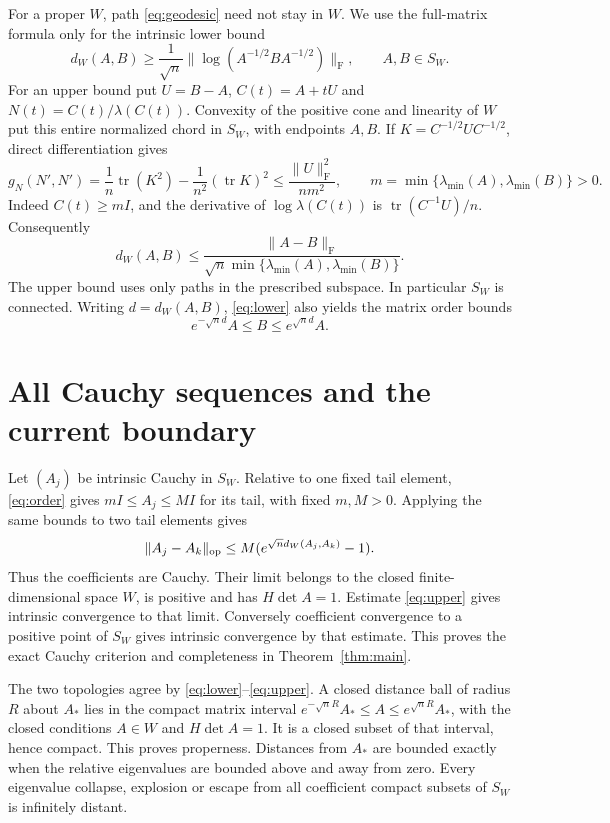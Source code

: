 \documentclass[11pt]{article}
\newcommand{\tr}{\operatorname{tr}}
\newcommand{\Frob}{\mathrm F}
\begin{document}
For a proper $W$, path \eqref{eq:geodesic} need not stay in $W$.
We use the full-matrix formula only for the intrinsic lower bound
\begin{equation}\label{eq:lower}
 d_W(A,B)\geq\frac1{\sqrt n}
                   \|\log(A^{-1/2}BA^{-1/2})\|_\Frob,
 \qquad A,B\in S_W.
\end{equation}
For an upper bound put $U=B-A$, $C(t)=A+tU$ and
$N(t)=C(t)/\lambda(C(t))$.
Convexity of the positive cone and linearity of $W$ put this entire
normalized chord in $S_W$, with endpoints $A,B$.
If $K=C^{-1/2}UC^{-1/2}$, direct differentiation gives
\[
 g_N(N',N')=\frac1n\tr(K^2)-\frac1{n^2}(\tr K)^2
 \leq\frac{\|U\|_\Frob^2}{nm^2},\qquad
 m=\min\{\lambda_{\min}(A),\lambda_{\min}(B)\}>0.
\]
Indeed $C(t)\geq mI$, and the derivative of $\log\lambda(C(t))$
is $\tr(C^{-1}U)/n$. Consequently
\begin{equation}\label{eq:upper}
 d_W(A,B)\leq\frac{\|A-B\|_\Frob}
                  {\sqrt n\min\{\lambda_{\min}(A),\lambda_{\min}(B)\}}.
\end{equation}
The upper bound uses only paths in the prescribed subspace.
In particular $S_W$ is connected.
Writing $d=d_W(A,B)$, \eqref{eq:lower} also yields the matrix order bounds
\begin{equation}\label{eq:order}
 e^{-\sqrt n d}A\leq B\leq e^{\sqrt n d}A.
\end{equation}

\section{All Cauchy sequences and the current boundary}
Let $(A_j)$ be intrinsic Cauchy in $S_W$.
Relative to one fixed tail element, \eqref{eq:order} gives
$mI\leq A_j\leq MI$ for its tail, with fixed $m,M>0$.
Applying the same bounds to two tail elements gives
\[
 \|A_j-A_k\|_{\rm op}\leq M(e^{\sqrt n d_W(A_j,A_k)}-1).
\]
Thus the coefficients are Cauchy. Their limit belongs to the closed
finite-dimensional space $W$, is positive and has $H\det A=1$.
Estimate \eqref{eq:upper} gives intrinsic convergence to that limit.
Conversely coefficient convergence to a positive point of $S_W$ gives
intrinsic convergence by that estimate. This proves the exact Cauchy
criterion and completeness in Theorem~\ref{thm:main}.

The two topologies agree by \eqref{eq:lower}--\eqref{eq:upper}.
A closed distance ball of radius $R$ about $A_*$ lies in the compact
matrix interval
$e^{-\sqrt nR}A_*\leq A\leq e^{\sqrt nR}A_*$, with the closed conditions
$A\in W$ and $H\det A=1$. It is a closed subset of that interval, hence
compact. This proves properness. Distances from $A_*$ are bounded exactly
when the relative eigenvalues are bounded above and away from zero.
Every eigenvalue collapse, explosion or escape from all coefficient
compact subsets of $S_W$ is infinitely distant.
\end{document}
